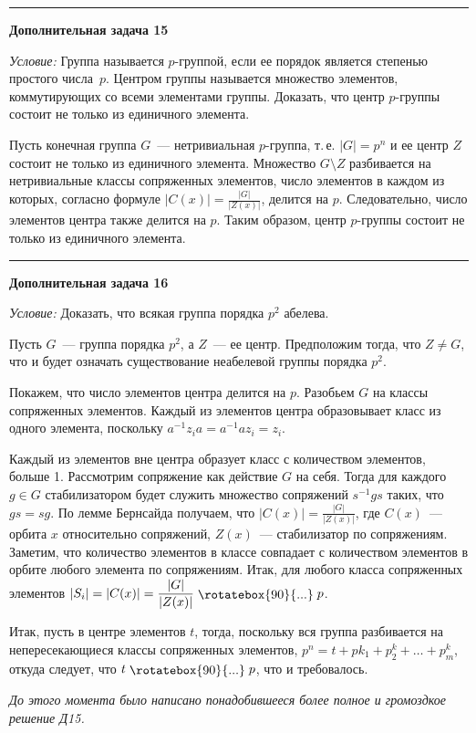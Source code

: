 \documentclass[12pt,a4paper]{article}
\newcommand{\divis}{\mathrel{\raisebox{-1pt}{\rotatebox{90}{...}}}}
\newcommand{\sbs}{\large \bfseries}
\newcommand{\rl}{\vspace{16pt} \hrule \vspace{8pt}}
\begin{document}
\rl
{\sbs Дополнительная задача 15}

{\itshape Условие: } Группа называется $p$-группой, если ее порядок является степенью простого числа~$p$. Центром группы называется множество элементов, коммутирующих со всеми элементами группы. Доказать, что центр  $p$-группы состоит не только из единичного элемента.

Пусть конечная группа $G$~--- нетривиальная $p$-группа, т.\,е.  $|G|=p^n$ и ее центр $Z$ состоит не только из единичного элемента. Множество $ G\setminus Z$ разбивается на нетривиальные классы сопряженных элементов, число элементов в каждом из которых, согласно формуле  $|C(x)|=\frac{|G|}{|Z(x)|}$, делится на  $p$. Следовательно, число элементов центра также делится на $p$. Таким образом, центр $p$-группы состоит не только из единичного элемента.




\rl
{\sbs Дополнительная задача 16}

{\itshape Условие: } Доказать, что всякая группа порядка $p^2$ абелева.

Пусть $G$~--- группа порядка $p^2$, а $Z$~--- ее центр. Предположим тогда, что $Z\neq G$, что и будет означать существование неабелевой группы порядка $p^2$.

Покажем, что число элементов центра делится на $p$. Разобьем $G$ на классы сопряженных элементов. Каждый из элементов центра образовывает класс из одного элемента, поскольку $a^{-1}z_ia = a^{-1}az_i = z_i$.

Каждый из элементов вне центра образует класс с количеством элементов, больше 1. Рассмотрим сопряжение как действие $G$ на себя. Тогда для каждого $g\in G$ стабилизатором будет служить множество сопряжений $s^{-1}gs$ таких, что $gs = sg$. По лемме Бернсайда получаем, что $\displaystyle |C(x)|=\frac{|G|}{|Z(x)|}$, где $C(x)$~--- орбита $x$ относительно сопряжений, $Z(x)$~--- стабилизатор по сопряжениям. Заметим, что количество элементов в классе совпадает с количеством элементов в орбите любого элемента по сопряжениям. Итак, для любого класса сопряженных элементов $\displaystyle |S_i|=|C(x)|=\frac{|G|}{|Z(x)|}\divis p$.

Итак, пусть в центре элементов $t$, тогда, поскольку вся группа разбивается на непересекающиеся классы сопряженных элементов, $p^n = t + pk_1 + p^k_2 +\ldots+ p^k_m$, откуда следует, что $t\divis p$, что и требовалось.

{\footnotesize \slshape До этого момента было написано понадобившееся более полное и громоздкое решение Д15.}
\end{document}
